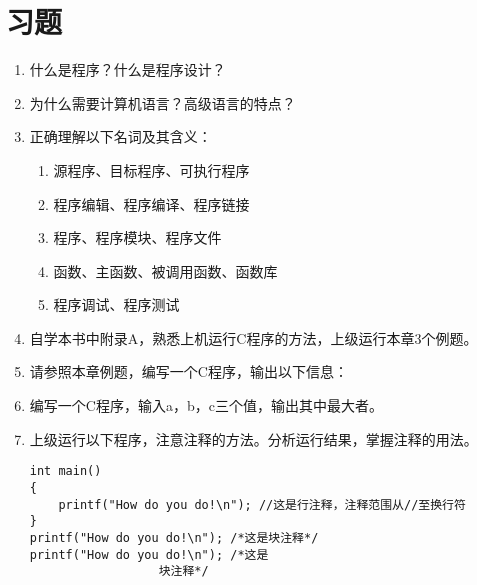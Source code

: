 \section{习题}
\begin{enumerate}
	\item 什么是程序？什么是程序设计？
	\item 为什么需要计算机语言？高级语言的特点？
	\item 正确理解以下名词及其含义：
		\begin{enumerate}
			\item 源程序、目标程序、可执行程序
			\item 程序编辑、程序编译、程序链接
			\item 程序、程序模块、程序文件
			\item 函数、主函数、被调用函数、函数库
			\item 程序调试、程序测试
		\end{enumerate}
	\item 自学本书中附录A，熟悉上机运行C程序的方法，上级运行本章3个例题。
	\item 请参照本章例题，编写一个C程序，输出以下信息：
	\item 编写一个C程序，输入a，b，c三个值，输出其中最大者。
	\item 上级运行以下程序，注意注释的方法。分析运行结果，掌握注释的用法。
		\begin{lstlisting}
int main()
{
    printf("How do you do!\n"); //这是行注释，注释范围从//至换行符
}
printf("How do you do!\n"); /*这是块注释*/
printf("How do you do!\n"); /*这是
			      块注释*/
	        \end{lstlisting}
\end{enumerate}
